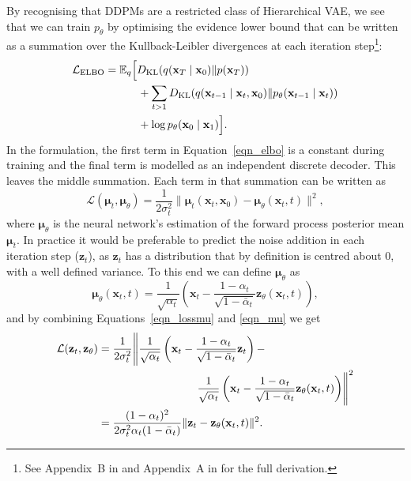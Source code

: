 \documentclass[fleqn,usenatbib]{mnras}
\begin{document}
By recognising that DDPMs are a restricted class of Hierarchical VAE, 
we see that we can train $p_\theta$ by optimising the evidence lower bound
\citep[ELBO, introduced in][]{cite_kingma2014} that can be written as a
summation over the Kullback-Leibler divergences at each iteration
step\footnote{
    See Appendix~B in \citet{cite_sohldickstein2015} and
    Appendix~A in \citet{cite_ho2020} for the full derivation.  
}:
\begin{align}
    \mathcal{L}_{\text{ELBO}} &= \mathbb{E}_q \Bigl[ D_\text{KL}(q(\mathbf{x}_T \mid \mathbf{x}_0) \| p(\mathbf{x}_T))\notag \\
                                &\qquad\quad+ \sum_{t > 1} D_\text{KL}(q(\mathbf{x}_{t - 1} \mid \mathbf{x}_t, \mathbf{x}_0) \| p_\theta(\mathbf{x}_{t - 1} \mid \mathbf{x}_t))\notag \\
                                &\qquad\quad+ \log p_\theta(\mathbf{x}_0 \mid \mathbf{x}_1)\Bigr].
                                \label{eqn_elbo}
\end{align}
In the \citet{cite_ho2020} formulation, the first term in
Equation~\ref{eqn_elbo} is a constant during training and the final term is
modelled as an independent discrete decoder. This leaves the middle summation.
Each term in that summation can be written as
\begin{equation}
    \mathcal{L}(\boldsymbol{\mu}_t, \boldsymbol{\mu}_\theta) = \frac{1}{2 \sigma_t^2} \| \boldsymbol{\mu}_t(\mathbf{x}_t, \mathbf{x}_0) - \boldsymbol{\mu}_\theta(\mathbf{x}_t, t) \|^2,
    \label{eqn_lossmu}
\end{equation}
where $\boldsymbol{\mu}_\theta$ is the neural network's estimation of the forward process
posterior mean $\boldsymbol{\mu}_t$. In practice it would be preferable to predict the noise
addition in each iteration step ($\mathbf{z}_t$), as $\mathbf{z}_t$ has a distribution that by
definition is centred about 0, with a well defined variance.  To this end we
can define $\boldsymbol{\mu}_\theta$ as
\begin{equation}
    \boldsymbol{\mu}_\theta(\mathbf{x}_t, t) = \frac{1}{\sqrt{\alpha_t}} \left(\mathbf{x}_t - \frac{1 - \alpha_t}{\sqrt{1 - \bar{\alpha}_t}} \mathbf{z}_\theta(\mathbf{x}_t, t)\right),
    \label{eqn_mu}
\end{equation}
and by combining Equations~\ref{eqn_lossmu} and \ref{eqn_mu} we get
\begin{align}
    \mathcal{L}(\mathbf{z}_t, \mathbf{z}_\theta) &= 
        \frac{1}{2 \sigma_t^2} \Biggl\| \frac{1}{\sqrt{\alpha_t}} \left(\mathbf{x}_t - \frac{1 - \alpha_t}{\sqrt{1 - \bar{\alpha}_t}} \mathbf{z}_t\right) -\notag \\
         &\qquad\qquad\qquad\qquad\quad \frac{1}{\sqrt{\alpha_t}} \left(\mathbf{x}_t - \frac{1 - \alpha_t}{\sqrt{1 - \bar{\alpha}_t}} \mathbf{z}_\theta(\mathbf{x}_t, t)\right) \Biggr\|^2\notag\\
         &= \frac{(1 - \alpha_t)^2}{2 \sigma_t^2 \alpha_t (1 - \bar{\alpha}_t)} \| \mathbf{z}_t - \mathbf{z}_\theta(\mathbf{x}_t, t) \|^2.
         \label{eqn_complexloss}
\end{align}
\end{document}
